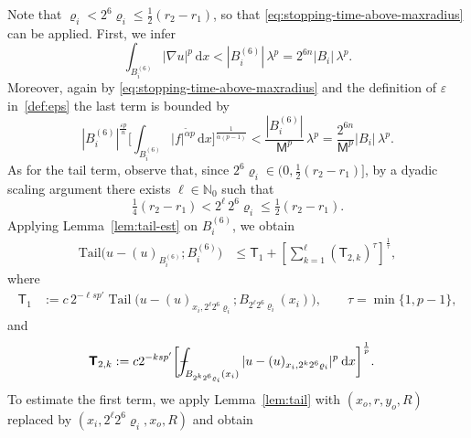 \documentclass[10pt,letterpaper]{amsart}
\theoremstyle{definition}
\numberwithin{theorem}{section}
\numberwithin{equation}{section}
\newcommand{\1}{\ensuremath{\mathds{1}}}
\newcommand{\dx}{\mathrm{d}x}
\newcommand\sfT{{\boldsymbol{\mathsf T}}}
\def\Xint#1{\mathchoice
    {\XXint\displaystyle\textstyle{#1}}%
    {\XXint\textstyle\scriptstyle{#1}}%
    {\XXint\scriptstyle\scriptscriptstyle{#1}}%
    {\XXint\scriptscriptstyle\scriptscriptstyle{#1}}%
    \!\int}
\def\XXint#1#2#3{\setbox0=\hbox{$#1{#2#3}{\int}$}
    \vcenter{\hbox{$#2#3$}}\kern-0.5\wd0}
\def\bint{\Xint-}
\renewcommand{\epsilon}{\varepsilon}
\renewcommand{\rho}{\varrho}
\renewcommand{\epsilon}{\varepsilon}
\renewcommand{\rho}{\varrho}
\renewcommand{\d}{\:\! \mathrm{d}}
\DeclareMathOperator{\Tail}{Tail}
\numberwithin{equation}{section}
\begin{document}
Note that \(\rho_i< 2^{6}\rho_i \le \tfrac12 (r_2-r_1)\), so that
\eqref{eq:stopping-time-above-maxradius} can be applied.
First, we infer
\begin{equation*}
    \int_{B_i^{(6)}} |\nabla u|^p \,\dx
    <
    |B_i^{(6)}|\,\lambda^p
    =
    2^{6n}|B_i|\,\lambda^p .
\end{equation*}
Moreover, again by \eqref{eq:stopping-time-above-maxradius} and the definition of $\epsilon$ in~\eqref{def:eps} the last term is bounded by
\begin{equation*}
    |B_i^{(6)}|^{\frac{\varepsilon p}{n}}
    \bigg[
        \int_{B_i^{(6)}} |f|^{\tilde\alpha p}\,\dx
    \bigg]^{\frac{1}{\tilde\alpha(p-1)}}
    <
    \frac{|B_i^{(6)}|}{\mathsf M^p}\,\lambda^p
    =
    \frac{2^{6n}}{\mathsf M^p}|B_i|\,\lambda^p .
\end{equation*}
As for the tail term, observe that, since
\(2^6\rho_i \in \big(0,\tfrac12 (r_2-r_1)\big]\), by a dyadic scaling argument there exists
\(\ell\in\mathbb N_0\) such that
\begin{equation*}%
    \tfrac14(r_2-r_1)
    <
    2^\ell\,2^6\rho_i
    \le 
    \tfrac12 (r_2-r_1).
\end{equation*}
Applying Lemma~\ref{lem:tail-est} on $B_i^{(6)}$, we obtain
\begin{align*}
    \mathrm{Tail} \big(u-(u)_{B_i^{(6)}}; B_i^{(6)}\big)
    &\le
    \sfT_1
    +
    \left[ \sum_{k=1}^\ell (\sfT_{2,k})^\tau \right]^\frac{1}{\tau} ,
\end{align*}
where
\begin{align*}
    \sfT_1
    &:=
    c\, 2^{-\ell sp'}
    \Tail \big(u-(u)_{x_i,2^\ell 2^6\rho_i}; B_{2^\ell 2^6\rho_i}(x_i)\big),
    \qquad
    \tau  =\min \{1,p-1\},
\end{align*}
and
\begin{align*}
    \sfT_{2,k}
    &:=
    c  2^{-ksp'}
    \bigg[
        \bint_{B_{2^k2^6\rho_i}(x_i)}
        |u-(u)_{x_i,2^k2^6\rho_i}|^p\, \d x
    \bigg]^\frac1p.
\end{align*}
To estimate the first term, we apply Lemma~\ref{lem:tail} with
$(x_o,r,y_o,R)$ replaced by $(x_i,2^\ell 2^6\rho_i,x_o,R)$ and obtain
\end{document}
